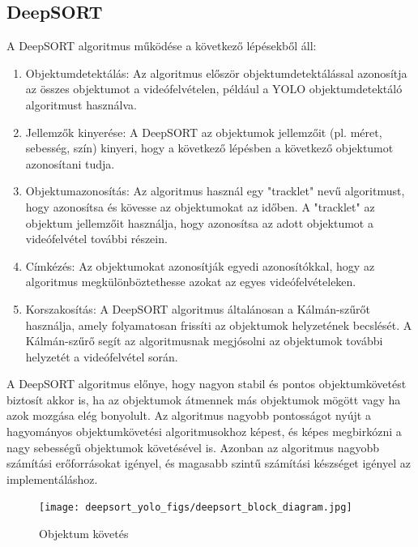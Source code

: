 \documentclass[12pt,a4paper]{article}
\begin{document}
\subsection{DeepSORT}
A DeepSORT algoritmus működése a következő lépésekből áll:
\begin{enumerate}
    \item Objektumdetektálás: Az algoritmus először objektumdetektálással azonosítja az összes objektumot a videófelvételen, például a YOLO objektumdetektáló algoritmust használva.
    \item Jellemzők kinyerése: A DeepSORT az objektumok jellemzőit (pl. méret, sebesség, szín) kinyeri, hogy a következő lépésben a következő objektumot azonosítani tudja.
    \item Objektumazonosítás: Az algoritmus használ egy "tracklet" nevű algoritmust, hogy azonosítsa és kövesse az objektumokat az időben. A "tracklet" az objektum jellemzőit használja, hogy azonosítsa az adott objektumot a videófelvétel további részein.
    \item Címkézés: Az objektumokat azonosítják egyedi azonosítókkal, hogy az algoritmus megkülönböztethesse azokat az egyes videófelvételeken.
    \item Korszakosítás: A DeepSORT algoritmus általánosan a Kálmán-szűrőt használja, amely folyamatosan frissíti az objektumok helyzetének becslését. A Kálmán-szűrő segít az algoritmusnak megjósolni az objektumok további helyzetét a videófelvétel során.
\end{enumerate}
A DeepSORT algoritmus előnye, hogy nagyon stabil és pontos objektumkövetést biztosít akkor is, ha az objektumok átmennek más objektumok mögött vagy ha azok mozgása elég bonyolult. Az algoritmus nagyobb pontosságot nyújt a hagyományos objektumkövetési algoritmusokhoz képest, és képes megbirkózni a nagy sebességű objektumok követésével is. Azonban az algoritmus nagyobb számítási erőforrásokat igényel, és magasabb szintű számítási készséget igényel az implementáláshoz.
\begin{figure}
    \texttt{[image: deepsort\_yolo\_figs/deepsort\_block\_diagram.jpg]}
    \caption{Objektum követés}
    \label{ObjectTracking}
\end{figure}
\end{document}
